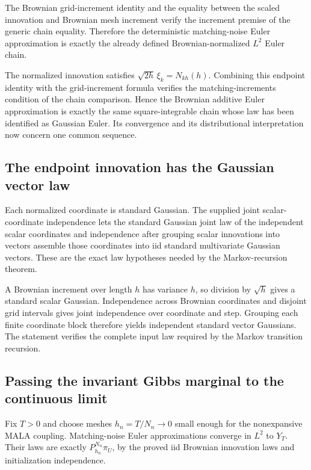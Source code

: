 \documentclass[11pt,a4paper]{article}
\begin{document}
The Brownian grid-increment identity and the equality between the scaled innovation and Brownian mesh increment verify the increment premise of the generic chain equality. Therefore the deterministic matching-noise Euler approximation is exactly the already defined Brownian-normalized \(L^2\) Euler chain.



The normalized innovation satisfies \(\sqrt{2h}\,\xi_k=N_{kh}(h)\). Combining this endpoint identity with the grid-increment formula verifies the matching-increments condition of the chain comparison. Hence the Brownian additive Euler approximation is exactly the same square-integrable chain whose law has been identified as Gaussian Euler. Its convergence and its distributional interpretation now concern one common sequence.


\subsection{\texorpdfstring{The endpoint innovation has the Gaussian vector law}{The endpoint innovation has the Gaussian vector law}}


Each normalized coordinate is standard Gaussian. The supplied joint scalar-coordinate independence lets the standard Gaussian joint law of the independent scalar coordinates and independence after grouping scalar innovations into vectors assemble those coordinates into iid standard multivariate Gaussian vectors. These are the exact law hypotheses needed by the Markov-recursion theorem.



A Brownian increment over length \(h\) has variance \(h\), so division by \(\sqrt h\) gives a standard scalar Gaussian. Independence across Brownian coordinates and disjoint grid intervals gives joint independence over coordinate and step. Grouping each finite coordinate block therefore yields independent standard vector Gaussians. The statement verifies the complete input law required by the Markov transition recursion.


\subsection{\texorpdfstring{Passing the invariant Gibbs marginal to the continuous limit}{Passing the invariant Gibbs marginal to the continuous limit}}


Fix \(T>0\) and choose meshes \(h_n=T/N_n\to0\) small enough for the nonexpansive MALA coupling. Matching-noise Euler approximations converge in \(L^2\) to \(Y_T\). Their laws are exactly \(P_{h_n}^{N_n}\pi_U\), by the proved iid Brownian innovation laws and initialization independence.
\end{document}
